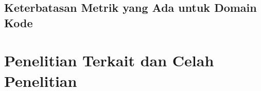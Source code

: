 

\subsection{Keterbatasan Metrik yang Ada untuk Domain Kode}
\label{sec:batas-metrik}

\section{Penelitian Terkait dan Celah Penelitian}
\label{sec:penelitian-terkait}



